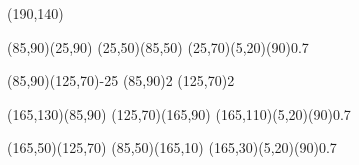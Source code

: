 \documentclass{standalone}
\begin{document}
\begin{axopicture}(190,140)

  \Line[arrow](85,90)(25,90)       %
  \Line[arrow](25,50)(85,50)       %
  \GOval(25,70)(5,20)(90){0.7}     %
                                   
  \Photon(85,90)(125,70){-2}{5}    %
  \Vertex(85,90){2}                %
  \Vertex(125,70){2}               %
                                   
  \Line[arrow](165,130)(85,90)     %
  \Line[arrow](125,70)(165,90)     %
  \GOval(165,110)(5,20)(90){0.7}   %
                                   
  \Line[arrow](165,50)(125,70)     %
  \Line[arrow](85,50)(165,10)      %
  \GOval(165,30)(5,20)(90){0.7}    %
                                   
\end{axopicture}
\end{document}
